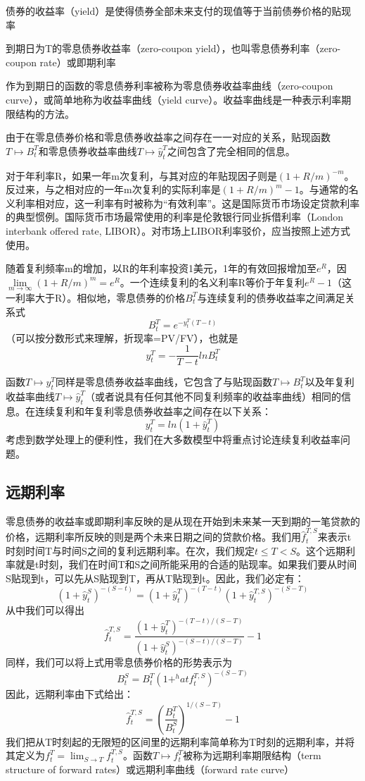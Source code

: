\documentclass[UTF8]{ctexart}
\begin{document}
债券的收益率（yield）是使得债券全部未来支付的现值等于当前债券价格的贴现率

到期日为T的零息债券收益率（zero-coupon yield），也叫零息债券利率（zero-coupon rate）或即期利率

作为到期日的函数的零息债券利率被称为零息债券收益率曲线（zero-coupon curve），或简单地称为收益率曲线（yield curve）。收益率曲线是一种表示利率期限结构的方法。

由于在零息债券价格和零息债券收益率之间存在一一对应的关系，贴现函数$T \mapsto B^T_t$和零息债券收益率曲线$T \mapsto \hat y_t^T$之间包含了完全相同的信息。

对于年利率R，如果一年m次复利，与其对应的年贴现因子则是$(1+R/m)^{-m}$。反过来，与之相对应的一年m次复利的实际利率是$(1+R/m)^m-1$。与通常的名义利率相对应，这一利率有时被称为“有效利率”。这是国际货币市场设定贷款利率的典型惯例。国际货币市场最常使用的利率是伦敦银行同业拆借利率（London interbank offered rate, LIBOR）。对市场上LIBOR利率驳价，应当按照上述方式使用。

随着复利频率m的增加，以R的年利率投资1美元，1年的有效回报增加至$e^R$，因$\lim\limits_{m\rightarrow \infty}(1+R/m)^m=e^R$。一个连续复利的名义利率R等价于年复利$e^R-1$（这一利率大于R）。相似地，零息债券的价格$B_t^T$与连续复利的债券收益率之间满足关系式$$B_t^T=e^{-y^T_t(T-t)}$$
（可以按分数形式来理解，折现率=PV/FV），也就是$$y_t^T=-\frac {1} {T-t}ln B_t^T$$

函数$T \mapsto y_t^T$同样是零息债券收益率曲线，它包含了与贴现函数$T \mapsto B_t^T$以及年复利收益率曲线$T \mapsto \hat y_t^T$（或者说具有任何其他不同复利频率的收益率曲线）相同的信息。在连续复利和年复利零息债券收益率之间存在以下关系：$$y_t^T=ln(1+\hat y_t^T)$$考虑到数学处理上的便利性，我们在大多数模型中将重点讨论连续复利收益率问题。

\subsection{远期利率}

零息债券的收益率或即期利率反映的是从现在开始到未来某一天到期的一笔贷款的价格，远期利率所反映的则是两个未来日期之间的贷款价格。我们用$\hat f_t^{T,S}$来表示t时刻时间T与时间S之间的复利远期利率。在次，我们规定$t \leq T < S$。这个远期利率就是t时刻，我们在时间T和S之间所能采用的合适的贴现率。如果我们要从时间S贴现到t，可以先从S贴现到T，再从T贴现到t。因此，我们必定有：$$(1+\hat y_t^S)^{-(S-t)} = (1+\hat y_t^T)^{-(T-t)} (1+\hat y_t^{T,S})^{-(S-T)} $$从中我们可以得出$$\hat f_t^{T,S}=\frac {(1+\hat y_t^T)^{-(T-t)/(S-T)}} {(1+\hat y_t^S)^{-(S-t)/(S-T)}} -1 $$
同样，我们可以将上式用零息债券价格的形势表示为$$B_t^S=B_t^T(1+^hat f_t^{T,S})^{-(S-T)}$$因此，远期利率由下式给出：$$\hat f_t^{T,S}=(\frac{B_t^T}{B_t^S})^{1/(S-T)}-1$$
我们把从T时刻起的无限短的区间里的远期利率简单称为T时刻的远期利率，并将其定义为$f_t^T=\lim_{S \rightarrow T}f_t^{T,S}$。函数$T \mapsto f_t^T$被称为远期利率期限结构（term structure of forward rates）或远期利率曲线（forward rate curve）
\end{document}
